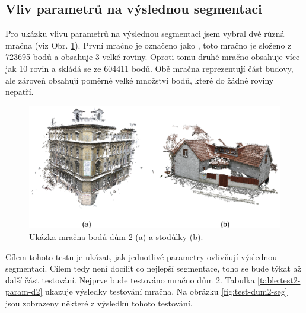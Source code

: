 \documentclass[11pt,twoside,a4paper]{book}
\begin{document}
\subsection{Vliv parametrů na výslednou segmentaci}
\label{sub:vliv-param}

Pro ukázku vlivu parametrů na výslednou segmentaci jsem vybral dvě různá mračna (viz Obr. \ref{fig:dum-stodulky}). První mračno je označeno jako , toto mračno je složeno z 723695 bodů a obsahuje 3 velké roviny. Oproti tomu druhé mračno  obsahuje více jak 10 rovin a skládá se ze 604411 bodů. Obě mračna reprezentují část budovy, ale zároveň obsahují poměrně velké množství bodů, které do žádné roviny nepatří.

\begin{figure}[H]
\begin{center}
\includegraphics[width=\textwidth]{figures/dum2-stodulky}
\caption{Ukázka mračna bodů dům 2 (a) a stodůlky (b).}
\label{fig:dum-stodulky}
\end{center}
\end{figure}

Cílem tohoto testu je ukázat, jak jednotlivé parametry ovlivňují výslednou segmentaci. Cílem tedy není docílit co nejlepší segmentace, toho se bude týkat až další část testování. Nejprve bude testováno mračno dům 2. Tabulka \ref{table:test2-param-d2} ukazuje výsledky testování mračna. Na obrázku \ref{fig:test-dum2-seg} jsou zobrazeny některé z výsledků tohoto testování.
\end{document}
